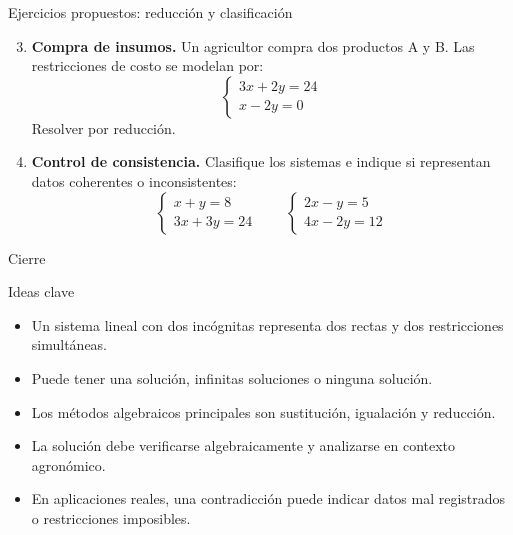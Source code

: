 \documentclass[aspectratio=169]{beamer}
\begin{document}
\begin{frame}{Ejercicios propuestos: reducción y clasificación}
	\small
	\begin{enumerate}
		\setcounter{enumi}{2}
		\item \textbf{Compra de insumos.} Un agricultor compra dos productos A y B. Las restricciones de costo se modelan por:
		\[
		\begin{cases}
		3x+2y=24\\
		x-2y=0
		\end{cases}
		\]
		Resolver por reducción.
		
		\item \textbf{Control de consistencia.} Clasifique los sistemas e indique si representan datos coherentes o inconsistentes:
		\[
		\begin{cases}
		x+y=8\\
		3x+3y=24
		\end{cases}
		\qquad
		\begin{cases}
		2x-y=5\\
		4x-2y=12
		\end{cases}
		\]
	\end{enumerate}
\end{frame}
	
\begin{frame}{Cierre}
	\begin{block}{Ideas clave}
		\begin{itemize}
			\item Un sistema lineal con dos incógnitas representa dos rectas y dos restricciones simultáneas.
			\item Puede tener una solución, infinitas soluciones o ninguna solución.
			\item Los métodos algebraicos principales son sustitución, igualación y reducción.
			\item La solución debe verificarse algebraicamente y analizarse en contexto agronómico.
			\item En aplicaciones reales, una contradicción puede indicar datos mal registrados o restricciones imposibles.
		\end{itemize}
	\end{block}
\end{frame}
	
\end{document}
